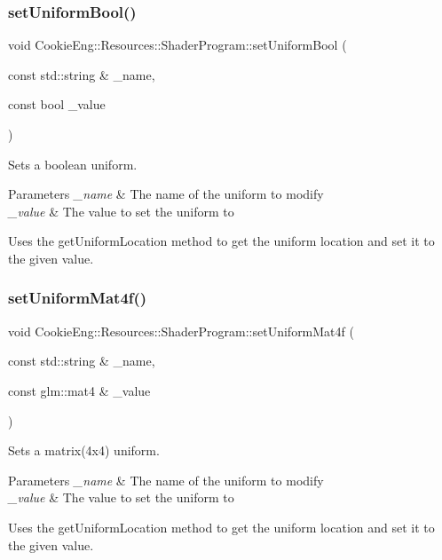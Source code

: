 \subsubsection{\texorpdfstring{set\+Uniform\+Bool()}{setUniformBool()}}
{\footnotesize\ttfamily void Cookie\+Eng\+::\+Resources\+::\+Shader\+Program\+::set\+Uniform\+Bool (\begin{DoxyParamCaption}\item[{const std\+::string \&}]{\+\_\+name,  }\item[{const bool}]{\+\_\+value }\end{DoxyParamCaption})}



Sets a boolean uniform. 


\begin{DoxyParams}{Parameters}
{\em \+\_\+name} & The name of the uniform to modify \\
\hline
{\em \+\_\+value} & The value to set the uniform to\\
\hline
\end{DoxyParams}
Uses the get\+Uniform\+Location method to get the uniform location and set it to the given value. \mbox{\label{class_cookie_eng_1_1_resources_1_1_shader_program_a172752bb917cb141b1a3a1cc44b6a645}} 
\subsubsection{\texorpdfstring{set\+Uniform\+Mat4f()}{setUniformMat4f()}}
{\footnotesize\ttfamily void Cookie\+Eng\+::\+Resources\+::\+Shader\+Program\+::set\+Uniform\+Mat4f (\begin{DoxyParamCaption}\item[{const std\+::string \&}]{\+\_\+name,  }\item[{const glm\+::mat4 \&}]{\+\_\+value }\end{DoxyParamCaption})}



Sets a matrix(4x4) uniform. 


\begin{DoxyParams}{Parameters}
{\em \+\_\+name} & The name of the uniform to modify \\
\hline
{\em \+\_\+value} & The value to set the uniform to\\
\hline
\end{DoxyParams}
Uses the get\+Uniform\+Location method to get the uniform location and set it to the given value. \mbox{\label{class_cookie_eng_1_1_resources_1_1_shader_program_a3fad7ebcee80d0cae25dfcca62c70e63}} 
